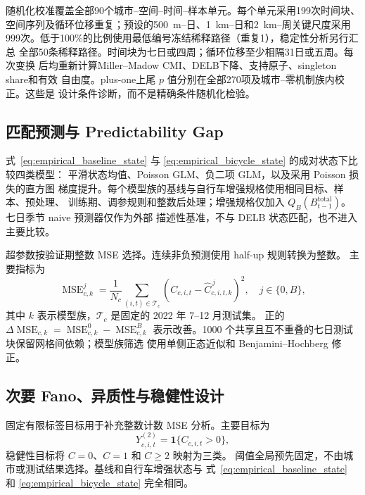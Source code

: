 随机化校准覆盖全部90个城市--空间--时间--样本单元。每个单元采用199次时间块、
空间序列及循环位移重复；预设的500~m--日、1~km--日和2~km--周关键尺度采用
999次。低于100\%的比例使用最低编号冻结稀释路径（重复1），稳定性分析另行汇总
全部50条稀释路径。时间块为七日或四周；循环位移至少相隔31日或五周。每次变换
后均重新计算Miller--Madow CMI、DELB下降、支持原子、singleton share和有效
自由度。plus-one上尾 \(p\) 值分别在全部270项及城市--零机制族内校正。这些是
设计条件诊断，而不是精确条件随机化检验。

\subsection{匹配预测与 Predictability Gap}
\label{subsec:prediction_experiment}
\label{subsec:methods_prediction}

式~\eqref{eq:empirical_baseline_state} 与
\eqref{eq:empirical_bicycle_state} 的成对状态下比较四类模型：
平滑状态均值、Poisson GLM、负二项 GLM，以及采用 Poisson 损失的直方图
梯度提升。每个模型族的基线与自行车增强规格使用相同目标、样本、预处理、
训练期、调参规则和整数后处理；增强规格仅加入
\(Q_B(B^{\mathrm{total}}_{t-1})\)。七日季节 naive 预测器仅作为外部
描述性基准，不与 DELB 状态匹配，也不进入主要比较。

超参数按验证期整数 MSE 选择。连续非负预测使用 half-up 规则转换为整数。
主要指标为
\begin{equation}
\operatorname{MSE}^{j}_{c,k}
=\frac{1}{N_c}\sum_{(i,t)\in\mathcal T_c}
\left(C_{c,i,t}-\widehat C^{\,j}_{c,i,t,k}\right)^2,
\quad j\in\{0,B\},
\label{eq:empirical_mse}
\end{equation}
其中 \(k\) 表示模型族，\(\mathcal T_c\) 是固定的 2022 年 7--12 月测试集。
正的
\(\Delta\operatorname{MSE}_{c,k}
=\operatorname{MSE}^{0}_{c,k}-\operatorname{MSE}^{B}_{c,k}\)
表示改善。1000 个共享且互不重叠的七日测试块保留网格间依赖；模型族筛选
使用单侧正态近似和 Benjamini--Hochberg 修正。

\subsection{次要 Fano、异质性与稳健性设计}
\label{subsec:fano_validation_methods}

固定有限标签目标用于补充整数计数 MSE 分析。主要目标为
\[
Y^{(2)}_{c,i,t}=\mathbf 1\{C_{c,i,t}>0\},
\]
稳健性目标将 \(C=0\)、\(C=1\) 和 \(C\geq2\) 映射为三类。
阈值全局预先固定，不由城市或测试结果选择。基线和自行车增强状态与
式~\eqref{eq:empirical_baseline_state} 和
\eqref{eq:empirical_bicycle_state} 完全相同。

